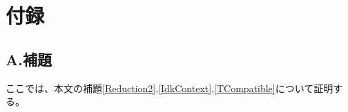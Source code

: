 \section*{付録}

\subsection*{A.補題}
ここでは、本文の補題\ref{Reduction2},\ref{IdkContext},\ref{TCompatible}について証明する。
